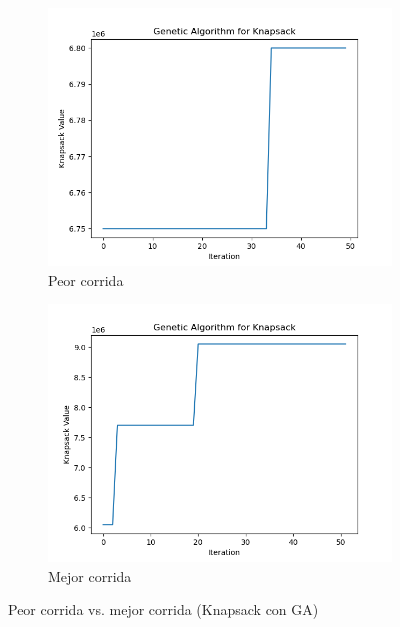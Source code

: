 \documentclass[a4paper, 12pt]{article}
\begin{document}
\begin{figure}[!ht]
    \centering
    \begin{subfigure}[b]{0.48\textwidth}
        \centering
        \includegraphics[width=\textwidth]{img/corrida_1.png}
        \caption{Peor corrida}
        \label{subfig:corrida1}
    \end{subfigure}
    \hfill
    \begin{subfigure}[b]{0.48\textwidth}
        \centering
        \includegraphics[width=\textwidth]{img/corrida_2.png}
        \caption{Mejor corrida}
        \label{subfig:corrida2}
    \end{subfigure}
    \caption{Peor corrida vs. mejor corrida (Knapsack con GA)}
\end{figure}
\end{document}
